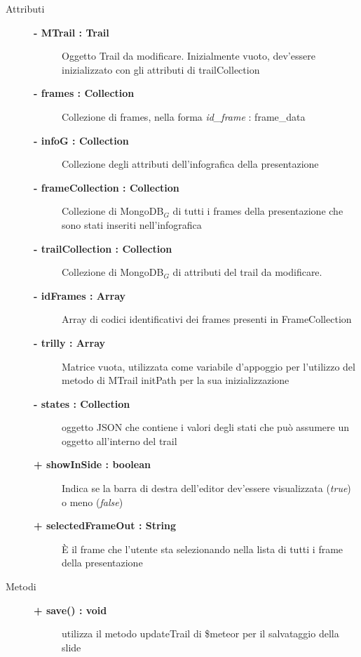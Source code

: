 \begin{description}
	
\item[Attributi] \hfill
	\begin{description}
		\item[\textbf{- MTrail : Trail			}] \hfill
			Oggetto Trail da modificare. Inizialmente vuoto, dev'essere inizializzato con gli attributi di trailCollection
		\item[\textbf{- frames : Collection			}] \hfill
			Collezione di frames, nella forma \textit{id\_frame} : frame\_data
		\item[\textbf{- infoG : Collection			}] \hfill
			Collezione degli attributi dell'infografica della presentazione
		\item[\textbf{- frameCollection : Collection			}] \hfill
			Collezione di MongoDB$_G$ di tutti i frames della presentazione che sono stati inseriti nell'infografica
		\item[\textbf{- trailCollection : Collection			}] \hfill
			Collezione di MongoDB$_G$ di attributi del trail da modificare.
		\item[\textbf{- idFrames : Array			}] \hfill
			Array di codici identificativi dei frames presenti in FrameCollection
		\item[\textbf{- trilly : Array			}] \hfill
			Matrice vuota, utilizzata come variabile d'appoggio per l'utilizzo del metodo di MTrail initPath per la sua inizializzazione
		\item[\textbf{- states : Collection			}] \hfill
			oggetto JSON che contiene i valori degli stati che può assumere un oggetto all'interno del trail
		\item[\textbf{+ showInSide : boolean			}] \hfill
			Indica se la barra di destra dell'editor dev'essere visualizzata (\textit{true}) o meno (\textit{false})
		\item[\textbf{+ selectedFrameOut : String			}] \hfill
			È il frame che l'utente sta selezionando nella lista di tutti i frame della presentazione
	\end{description}
	
	
\item[Metodi] \hfill

	\begin{description}
		\item[\textbf{\color{blue}+ save() : void			}] \hfill
			utilizza il metodo updateTrail di \$meteor per il salvataggio della slide
	\end{description}
	

\end{description}

